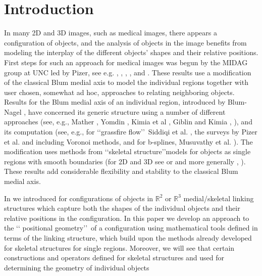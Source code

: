 \documentclass[10pt]{amsart}
\theoremstyle{definition}
\theoremstyle{definition}
\numberwithin{equation}{section}
\newcommand{\R}{{\mathbb R}}
\begin{document}
\maketitle





\section{Introduction}\label{S:sec0}

In many 2D and 3D images, such as medical images, there appears a 
configuration of objects, and the analysis of objects in the image benefits 
from modeling the interplay of the different objects' shapes and their 
relative positions.  First steps for such an approach for medical images 
was begun by the MIDAG group at UNC led by Pizer, see e.g. \cite{JSM}, 
\cite{LPJ}, \cite{JPR}, \cite{GSJ}, and \cite{CP}.  These results use a 
modification of the classical Blum medial axis to model the individual 
regions together with user chosen, somewhat ad hoc, approaches to 
relating neighboring objects.  Results for the Blum medial axis of an
individual region, introduced by Blum-Nagel \cite{BN}, have concerned its 
generic structure using a number of different approaches (see, e.g., Mather 
\cite{M}, Yomdin \cite{Y}, Kimia et al \cite{KTZ}, Giblin and Kimia 
\cite{Gb}, \cite{GK}), and its computation (see, e.g., for \lq\lq grassfire 
flow\rq\rq\, Siddiqi et al. \cite{SBTZ}, the surveys by Pizer et al. \cite{P} and 
\cite{PS} including Voronoi methods, and for b-splines, Musuvathy et al.
\cite{MCD}).  The modification uses methods from \lq\lq skeletal 
structure\rq\rq models for objects as single regions with smooth 
boundaries (for 2D and 3D see \cite{D3} or \cite{D5} and more generally 
\cite{D1}, \cite{D2}).  These results add considerable flexibility and 
stability to the classical Blum medial axis.
  \par
In \cite{DG1} we introduced for configurations of objects in $\R^2$ or 
$\R^3$ medial/skeletal linking structures which capture both the 
shapes of the individual objects and their relative positions in the 
configuration.  In this paper we develop an approach to the \lq\lq 
positional geometry\rq\rq\, of a configuration using mathematical tools 
defined in terms of the linking structure, which build upon the methods 
already developed for skeletal structures for single regions.  Moreover, we 
will see that certain constructions and operators defined for skeletal 
structures and used for determining the geometry of individual objects 
\end{document}
